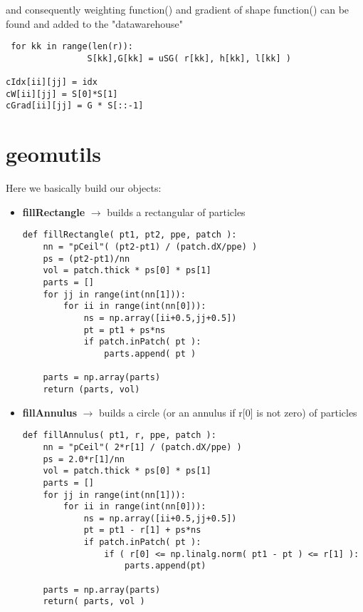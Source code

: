 \documentclass[11pt,fleqn]{book} %
\begin{document}
and consequently weighting function() and gradient of shape function() can be found and added to the "datawarehouse"

\begin{lstlisting}
 for kk in range(len(r)):
                S[kk],G[kk] = uSG( r[kk], h[kk], l[kk] )

cIdx[ii][jj] = idx
cW[ii][jj] = S[0]*S[1]
cGrad[ii][jj] = G * S[::-1] 
\end{lstlisting}







\chapter{geomutils}
\label{chap:geomutils}
Here we basically build our objects:
\begin{itemize}
\item  \textbf{fillRectangle} $\rightarrow$ builds a rectangular of particles
\begin{lstlisting}
def fillRectangle( pt1, pt2, ppe, patch ):
    nn = "pCeil"( (pt2-pt1) / (patch.dX/ppe) )
    ps = (pt2-pt1)/nn
    vol = patch.thick * ps[0] * ps[1]
    parts = []
    for jj in range(int(nn[1])):
        for ii in range(int(nn[0])):
            ns = np.array([ii+0.5,jj+0.5])
            pt = pt1 + ps*ns
            if patch.inPatch( pt ):
                parts.append( pt )
                
    parts = np.array(parts)
    return (parts, vol)
\end{lstlisting}
\item  \textbf{fillAnnulus} $\rightarrow$ builds a circle (or an annulus if r[0] is not zero) of particles
\begin{lstlisting}
def fillAnnulus( pt1, r, ppe, patch ):
    nn = "pCeil"( 2*r[1] / (patch.dX/ppe) )
    ps = 2.0*r[1]/nn
    vol = patch.thick * ps[0] * ps[1]
    parts = []
    for jj in range(int(nn[1])):
        for ii in range(int(nn[0])):
            ns = np.array([ii+0.5,jj+0.5])
            pt = pt1 - r[1] + ps*ns
            if patch.inPatch( pt ):
                if ( r[0] <= np.linalg.norm( pt1 - pt ) <= r[1] ):
                    parts.append(pt)

    parts = np.array(parts)
    return( parts, vol )
\end{lstlisting}
\end{itemize}
\end{document}
